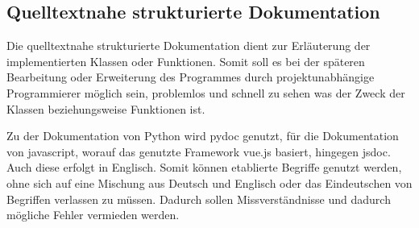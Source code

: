 \subsection{Quelltextnahe strukturierte Dokumentation}
Die quelltextnahe strukturierte Dokumentation dient zur Erläuterung der implementierten Klassen oder Funktionen. Somit soll es bei der späteren Bearbeitung oder Erweiterung des Programmes durch projektunabhängige Programmierer möglich sein, problemlos und schnell zu sehen was der Zweck der Klassen beziehungsweise Funktionen ist.

Zu der Dokumentation von Python wird pydoc genutzt, für die Dokumentation von javascript, worauf das genutzte Framework vue.js basiert, hingegen jsdoc. Auch diese erfolgt in Englisch. Somit können etablierte Begriffe genutzt werden, ohne sich auf eine Mischung aus Deutsch und Englisch oder das Eindeutschen von Begriffen verlassen zu müssen. Dadurch sollen Missverständnisse und dadurch mögliche Fehler vermieden werden.